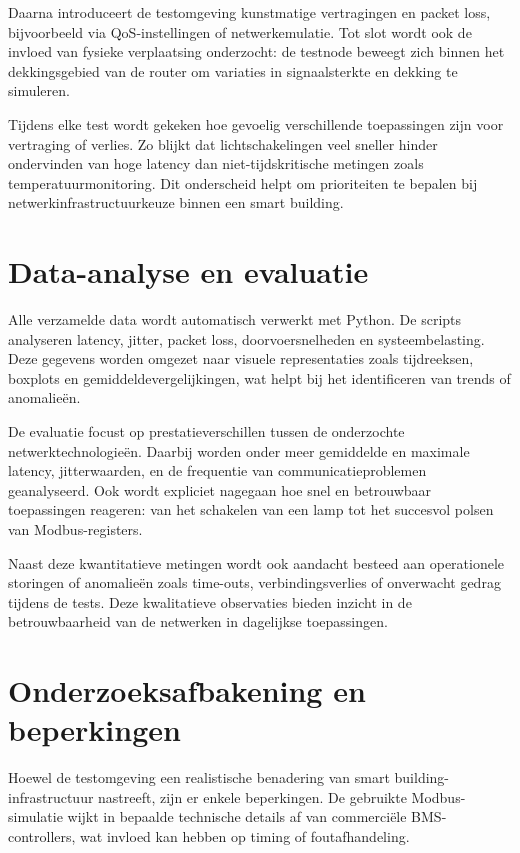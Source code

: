 Daarna introduceert de testomgeving kunstmatige vertragingen en packet loss, bijvoorbeeld via QoS-instellingen of netwerkemulatie. Tot slot wordt ook de invloed van fysieke verplaatsing onderzocht: de testnode beweegt zich binnen het dekkingsgebied van de router om variaties in signaalsterkte en dekking te simuleren.

Tijdens elke test wordt gekeken hoe gevoelig verschillende toepassingen zijn voor vertraging of verlies. Zo blijkt dat lichtschakelingen veel sneller hinder ondervinden van hoge latency dan niet-tijdskritische metingen zoals temperatuurmonitoring. Dit onderscheid helpt om prioriteiten te bepalen bij netwerkinfrastructuurkeuze binnen een smart building.

\section{Data-analyse en evaluatie}

Alle verzamelde data wordt automatisch verwerkt met Python. De scripts analyseren latency, jitter, packet loss, doorvoersnelheden en systeembelasting. Deze gegevens worden omgezet naar visuele representaties zoals tijdreeksen, boxplots en gemiddeldevergelijkingen, wat helpt bij het identificeren van trends of anomalieën.

De evaluatie focust op prestatieverschillen tussen de onderzochte netwerktechnologieën. Daarbij worden onder meer gemiddelde en maximale latency, jitterwaarden, en de frequentie van communicatieproblemen geanalyseerd. Ook wordt expliciet nagegaan hoe snel en betrouwbaar toepassingen reageren: van het schakelen van een lamp tot het succesvol polsen van Modbus-registers.

Naast deze kwantitatieve metingen wordt ook aandacht besteed aan operationele storingen of anomalieën zoals time-outs, verbindingsverlies of onverwacht gedrag tijdens de tests. Deze kwalitatieve observaties bieden inzicht in de betrouwbaarheid van de netwerken in dagelijkse toepassingen.

\section{Onderzoeksafbakening en beperkingen}

Hoewel de testomgeving een realistische benadering van smart building-infrastructuur nastreeft, zijn er enkele beperkingen. De gebruikte Modbus-simulatie wijkt in bepaalde technische details af van commerciële BMS-controllers, wat invloed kan hebben op timing of foutafhandeling.

